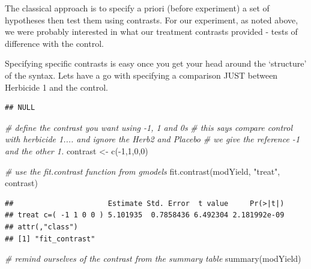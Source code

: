 \documentclass[
]{book}
\newenvironment{Shaded}{\begin{snugshade}}{\end{snugshade}}
\newcommand{\CommentTok}[1]{\textcolor[rgb]{0.56,0.35,0.01}{\textit{#1}}}
\newcommand{\DecValTok}[1]{\textcolor[rgb]{0.00,0.00,0.81}{#1}}
\newcommand{\FunctionTok}[1]{\textcolor[rgb]{0.00,0.00,0.00}{#1}}
\newcommand{\NormalTok}[1]{#1}
\newcommand{\OtherTok}[1]{\textcolor[rgb]{0.56,0.35,0.01}{#1}}
\newcommand{\SpecialCharTok}[1]{\textcolor[rgb]{0.00,0.00,0.00}{#1}}
\newcommand{\StringTok}[1]{\textcolor[rgb]{0.31,0.60,0.02}{#1}}
\begin{document}
The classical approach is to specify a priori (before experiment) a set of hypotheses then test them using contrasts. For our experiment, as noted above, we were probably interested in what our treatment contrasts provided - tests of difference with the control.

Specifying specific contrasts is easy once you get your head around the `structure' of the syntax. Lets have a go with specifying a comparison JUST between Herbicide 1 and the control.

\begin{Shaded}
\end{Shaded}

\begin{verbatim}
## NULL
\end{verbatim}

\begin{Shaded}
\begin{Highlighting}[]
\CommentTok{\# define the contrast you want using {-}1, 1 and 0\textquotesingle{}s}
\CommentTok{\# this says compare control with herbicide 1.... and ignore the Herb2 and Placebo}
\CommentTok{\# we give the reference {-}1 and the \textquotesingle{}other\textquotesingle{} 1.}
\NormalTok{contrast }\OtherTok{\textless{}{-}} \FunctionTok{c}\NormalTok{(}\SpecialCharTok{{-}}\DecValTok{1}\NormalTok{,}\DecValTok{1}\NormalTok{,}\DecValTok{0}\NormalTok{,}\DecValTok{0}\NormalTok{)}

\CommentTok{\# use the fit.contrast function from gmodels}
\FunctionTok{fit.contrast}\NormalTok{(modYield, }\StringTok{"treat"}\NormalTok{, contrast)}
\end{Highlighting}
\end{Shaded}

\begin{verbatim}
##                      Estimate Std. Error  t value     Pr(>|t|)
## treat c=( -1 1 0 0 ) 5.101935  0.7858436 6.492304 2.181992e-09
## attr(,"class")
## [1] "fit_contrast"
\end{verbatim}

\begin{Shaded}
\begin{Highlighting}[]
\CommentTok{\# remind ourselves of the contrast from the summary table}
\FunctionTok{summary}\NormalTok{(modYield)}
\end{Highlighting}
\end{Shaded}
\end{document}
